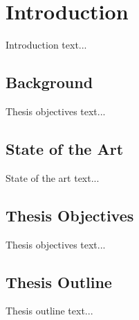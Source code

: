 \chapter{Introduction} \label{chap:introduction}
Introduction text...

\section{Background} \label{sec:background}
Thesis objectives text...

\section{State of the Art} \label{sec:state_of_the_art}
State of the art text... \citep{article:perceptron} \citep{article:pruning_algorithms}

\section{Thesis Objectives} \label{sec:thesis_objectives}
Thesis objectives text...

\section{Thesis Outline} \label{sec:thesis_outline}
Thesis outline text...